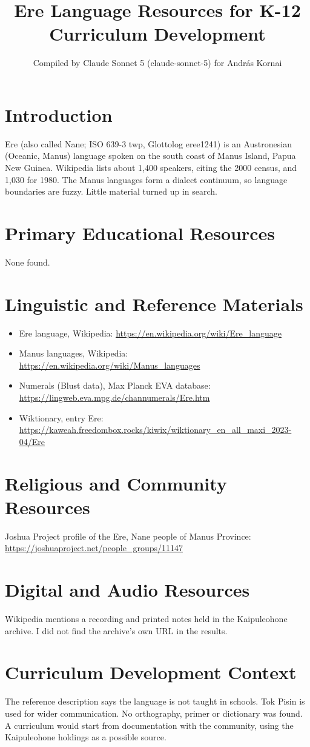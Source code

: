 \documentclass[12pt]{article}
\title{Ere Language Resources for K-12 Curriculum Development}
\author{Compiled by Claude Sonnet 5 (claude-sonnet-5) for Andr\'as Kornai}
\date{}
\begin{document}
\maketitle

\section{Introduction}
Ere (also called Nane; ISO 639-3 twp, Glottolog eree1241) is an Austronesian (Oceanic, Manus) language spoken on the south coast of Manus Island, Papua New Guinea. Wikipedia lists about 1,400 speakers, citing the 2000 census, and 1,030 for 1980. The Manus languages form a dialect continuum, so language boundaries are fuzzy. Little material turned up in search.

\section{Primary Educational Resources}
None found.

\section{Linguistic and Reference Materials}
\begin{itemize}
\item Ere language, Wikipedia: \url{https://en.wikipedia.org/wiki/Ere_language}
\item Manus languages, Wikipedia: \url{https://en.wikipedia.org/wiki/Manus_languages}
\item Numerals (Blust data), Max Planck EVA database: \url{https://lingweb.eva.mpg.de/channumerals/Ere.htm}
\item Wiktionary, entry Ere: \url{https://kaweah.freedombox.rocks/kiwix/wiktionary_en_all_maxi_2023-04/Ere}
\end{itemize}

\section{Religious and Community Resources}
Joshua Project profile of the Ere, Nane people of Manus Province: \url{https://joshuaproject.net/people_groups/11147}

\section{Digital and Audio Resources}
Wikipedia mentions a recording and printed notes held in the Kaipuleohone archive. I did not find the archive's own URL in the results.

\section{Curriculum Development Context}
The reference description says the language is not taught in schools. Tok Pisin is used for wider communication. No orthography, primer or dictionary was found. A curriculum would start from documentation with the community, using the Kaipuleohone holdings as a possible source.
\end{document}
